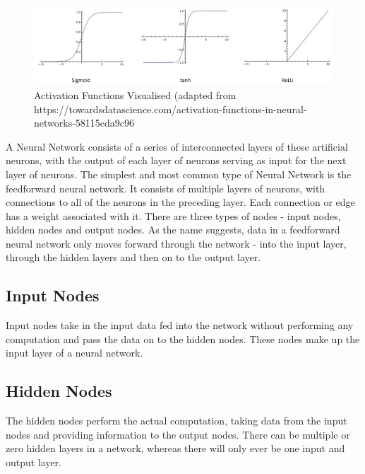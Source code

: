 \documentclass[12pt]{report}
\begin{document}
\vspace{0.5cm}
\begin{figure}[ht!]
	\centering
	\includegraphics[width=12cm]{functions}
	\caption{Activation Functions Visualised (adapted from https://towardsdatascience.com/activation-functions-in-neural-networks-58115cda9c96}
	\label{fig:functions}
\end{figure}

\begin{flushleft}
A Neural Network consists of a series of interconnected layers of these artificial neurons, with the output of each layer of neurons serving as input for the next layer of neurons. The simplest and most common type of Neural Network is the feedforward neural network. It consists of multiple layers of neurons, with connections to all of the neurons in the preceding layer. Each connection or edge has a weight associated with it. There are three types of nodes - input nodes, hidden nodes and output nodes. As the name suggests, data in a feedforward neural network only moves forward through the network - into the input layer, through the hidden layers and then on to the output layer.
\end{flushleft}

\subsection{Input Nodes}
\begin{flushleft}
Input nodes take in the input data fed into the network without performing any computation and pass the data on to the hidden nodes. These nodes make up the input layer of a neural network.
\end{flushleft}

\subsection{Hidden Nodes}
\begin{flushleft}
The hidden nodes perform the actual computation, taking data from the input nodes and providing information to the output nodes. There can be multiple or zero hidden layers in a network, whereas there will only ever be one input and output layer.
\end{flushleft}
\end{document}
